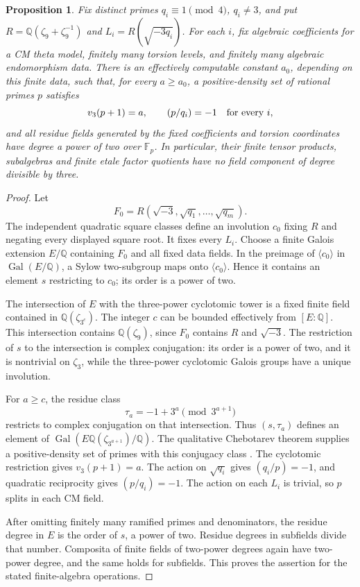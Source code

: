 \documentclass[11pt]{article}
\newtheorem{proposition}[theorem]{Proposition}
\theoremstyle{definition}
\theoremstyle{remark}
\begin{document}
\begin{proposition}\label{prop:kummer-fixed-cm-data-collapse}
Fix distinct primes \(q_i\equiv1\pmod4\), \(q_i\ne3\),
and put \(R=\mathbb Q(\zeta_9+\zeta_9^{-1})\) and
\(L_i=R(\sqrt{-3q_i})\). For each \(i\), fix algebraic
coefficients for a CM theta model, finitely many torsion levels,
and finitely many algebraic endomorphism data. There is an
effectively computable constant \(a_0\), depending on this
finite data, such that, for every \(a\ge a_0\), a positive-density
set of rational primes \(p\) satisfies
\[
 v_3(p+1)=a,\qquad (p/q_i)=-1\quad\hbox{for every }i,
\]
and all residue fields generated by the fixed coefficients and
torsion coordinates have degree a power of two over
\(\mathbb F_p\). In particular, their finite tensor products,
subalgebras and finite etale factor quotients have no field
component of degree divisible by three.
\end{proposition}
\begin{proof}
Let
\[
 F_0=R(\sqrt{-3},\sqrt{q_1},\ldots,\sqrt{q_m}).
\]
The independent quadratic square classes define an involution
\(c_0\) fixing \(R\) and negating every displayed square root.
It fixes every \(L_i\). Choose a finite Galois extension
\(E/\mathbb Q\) containing \(F_0\) and all fixed data fields.
In the preimage of \(\langle c_0\rangle\) in
\(\operatorname{Gal}(E/\mathbb Q)\), a Sylow two-subgroup
maps onto \(\langle c_0\rangle\). Hence it contains an
element \(s\) restricting to \(c_0\); its order is a power
of two.

The intersection of \(E\) with the three-power cyclotomic
tower is a fixed finite field contained in
\(\mathbb Q(\zeta_{3^c})\). The integer \(c\) can be
bounded effectively from \([E:\mathbb Q]\). This intersection
contains \(\mathbb Q(\zeta_9)\), since \(F_0\) contains
\(R\) and \(\sqrt{-3}\). The restriction of \(s\) to
the intersection is complex conjugation: its order is a power
of two, and it is nontrivial on \(\zeta_3\), while the
three-power cyclotomic Galois groups have a unique involution.

For \(a\ge c\), the residue class
\[
 \tau_a=-1+3^a\pmod{3^{a+1}}
\]
restricts to complex conjugation on that intersection. Thus
\((s,\tau_a)\) defines an element of
\(\operatorname{Gal}(E\mathbb Q(\zeta_{3^{a+1}})/\mathbb Q)\).
The qualitative Chebotarev theorem supplies a positive-density
set of primes with this conjugacy class
\citep[Section~2.1, Theorem~1, p.~131]{Serre1981Chebotarev}.
The cyclotomic restriction gives \(v_3(p+1)=a\).
The action on \(\sqrt{q_i}\) gives \((q_i/p)=-1\), and
quadratic reciprocity gives \((p/q_i)=-1\). The action on
each \(L_i\) is trivial, so \(p\) splits in each CM field.

After omitting finitely many ramified primes and denominators,
the residue degree in \(E\) is the order of \(s\), a power
of two. Residue degrees in subfields divide that number.
Composita of finite fields of two-power degrees again have
two-power degree, and the same holds for subfields. This proves
the assertion for the stated finite-algebra operations.
\end{proof}
\end{document}
